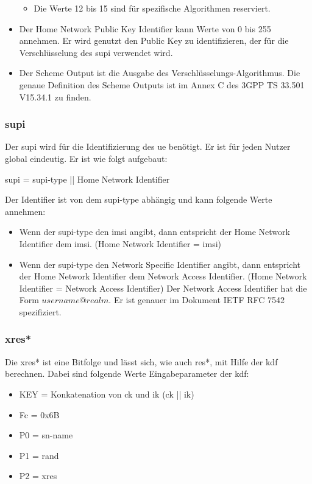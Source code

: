 \begin{itemize}
\begin{itemize}
\item Die Werte 12 bis 15 sind für spezifische Algorithmen reserviert.
\end{itemize}
\item Der Home Network Public Key Identifier kann Werte von 0 bis 255 annehmen.
Er wird genutzt den Public Key zu identifizieren, der für die Verschlüsselung des \gls{supi} verwendet wird.
\item Der Scheme Output ist die Ausgabe des Verschlüsselungs-Algorithmus.
Die genaue Definition des Scheme Outputs ist im Annex C des 3GPP TS 33.501 V15.34.1 zu finden. %
\end{itemize}

\subsubsection{\gls{supi}}
Der \gls{supi} wird für die Identifizierung des \gls{ue} benötigt.
Er ist für jeden Nutzer global eindeutig. 
Er ist wie folgt aufgebaut: %

\gls{supi} = \gls{supi-type} || Home Network Identifier

Der Identifier ist von dem \gls{supi-type} abhängig und kann folgende Werte annehmen:

\begin{itemize}
\item Wenn der \gls{supi-type} den \gls{imsi} angibt, dann entspricht der Home Network Identifier dem \gls{imsi}. (Home Network Identifier = \gls{imsi})
\item Wenn der \gls{supi-type} den Network Specific Identifier angibt, dann entspricht der Home Network Identifier dem Network Access Identifier. (Home Network Identifier = Network Access Identifier)
Der Network Access Identifier hat die Form $ username@realm $. 
Er ist genauer im Dokument IETF RFC 7542 spezifiziert. %
\end{itemize}

\subsubsection{\gls{xres*}}
Die \gls{xres*} ist eine Bitfolge und lässt sich, wie auch \gls{res*}, mit Hilfe der \gls{kdf} berechnen.
Dabei sind folgende Werte Eingabeparameter der \gls{kdf}: %
\begin{itemize}
\item KEY = Konkatenation von \gls{ck} und \gls{ik} (\gls{ck} || \gls{ik})
\item Fc = 0x6B
\item P0 = \gls{sn-name}
\item P1 = \gls{rand}
\item P2 = \gls{xres}
\end{itemize}

